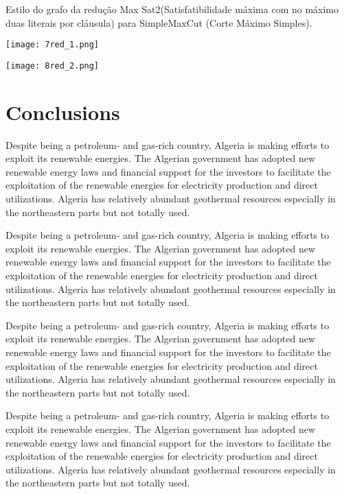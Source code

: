 \documentclass[a0,portrait]{a0poster}
\begin{document}
\begin{multicols}{3}
Estilo do grafo da redução Max Sat2(Satisfatibilidade
máxima 
com no máximo duas literais por cláusula) para
SimpleMaxCut (Corte Máximo Simples).

\medskip

\texttt{[image: 7red\_1.png]}

\texttt{[image: 8red\_2.png]}





\color{SaddleBrown} %

\section*{Conclusions}
Despite being a petroleum- and gas-rich country, Algeria is making efforts to exploit its renewable energies. The Algerian government has adopted new renewable energy laws and financial support for the investors to facilitate the exploitation of the renewable energies for electricity production and direct utilizations. Algeria has relatively abundant geothermal resources especially in the northeastern parts but not totally used.

Despite being a petroleum- and gas-rich country, Algeria is making efforts to exploit its renewable energies. The Algerian government has adopted new renewable energy laws and financial support for the investors to facilitate the exploitation of the renewable energies for electricity production and direct utilizations. Algeria has relatively abundant geothermal resources especially in the northeastern parts but not totally used.

Despite being a petroleum- and gas-rich country, Algeria is making efforts to exploit its renewable energies. The Algerian government has adopted new renewable energy laws and financial support for the investors to facilitate the exploitation of the renewable energies for electricity production and direct utilizations. Algeria has relatively abundant geothermal resources especially in the northeastern parts but not totally used.

Despite being a petroleum- and gas-rich country, Algeria is making efforts to exploit its renewable energies. The Algerian government has adopted new renewable energy laws and financial support for the investors to facilitate the exploitation of the renewable energies for electricity production and direct utilizations. Algeria has relatively abundant geothermal resources especially in the northeastern parts but not totally used.


\end{multicols}
\end{document}

